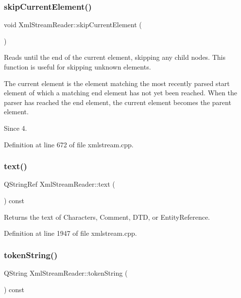 \subsubsection{\texorpdfstring{skip\+Current\+Element()}{skipCurrentElement()}}
{\footnotesize\ttfamily void Xml\+Stream\+Reader\+::skip\+Current\+Element (\begin{DoxyParamCaption}{ }\end{DoxyParamCaption})}

Reads until the end of the current element, skipping any child nodes. This function is useful for skipping unknown elements.

The current element is the element matching the most recently parsed start element of which a matching end element has not yet been reached. When the parser has reached the end element, the current element becomes the parent element.

\begin{DoxySince}{Since}
4. 
\end{DoxySince}


Definition at line 672 of file xmlstream.\+cpp.

\mbox{\label{class_xml_stream_reader_a1d129d0171b231efac34d7ee4480a50f}} 
\subsubsection{\texorpdfstring{text()}{text()}}
{\footnotesize\ttfamily Q\+String\+Ref Xml\+Stream\+Reader\+::text (\begin{DoxyParamCaption}{ }\end{DoxyParamCaption}) const}

Returns the text of  Characters,  Comment,  D\+TD, or Entity\+Reference. 

Definition at line 1947 of file xmlstream.\+cpp.

\mbox{\label{class_xml_stream_reader_a7e60a09f7692db1fccc420573b56c68b}} 
\subsubsection{\texorpdfstring{token\+String()}{tokenString()}}
{\footnotesize\ttfamily Q\+String Xml\+Stream\+Reader\+::token\+String (\begin{DoxyParamCaption}{ }\end{DoxyParamCaption}) const}

